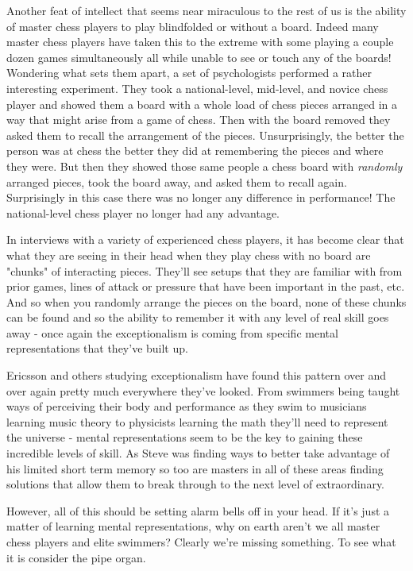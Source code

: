 \documentclass[11pt,a5paper]{book}
\begin{document}
Another feat of intellect that seems near miraculous to the rest of us is the ability of master chess players to play blindfolded or without a board. Indeed many master chess players have taken this to the extreme with some playing a couple dozen games simultaneously all while unable to see or touch any of the boards! Wondering what sets them apart, a set of psychologists performed a rather interesting experiment. They took a national-level, mid-level, and novice chess player and showed them a board with a whole load of chess pieces arranged in a way that might arise from a game of chess. Then with the board removed they asked them to recall the arrangement of the pieces. Unsurprisingly, the better the person was at chess the better they did at remembering the pieces and where they were. But then they showed those same people a chess board with \textit{randomly} arranged pieces, took the board away, and asked them to recall again. Surprisingly in this case there was no longer any difference in performance! The national-level chess player no longer had any advantage. 
\newline

In interviews with a variety of experienced chess players, it has become clear that what they are seeing in their head when they play chess with no board are "chunks" of interacting pieces. They'll see setups that they are familiar with from prior games, lines of attack or pressure that have been important in the past, etc. And so when you randomly arrange the pieces on the board, none of these chunks can be found and so the ability to remember it with any level of real skill goes away - once again the exceptionalism is coming from specific mental representations that they've built up. 
\newline 

Ericsson and others studying exceptionalism have found this pattern over and over again pretty much everywhere they've looked. From swimmers being taught ways of perceiving their body and performance as they swim to musicians learning music theory to physicists learning the math they'll need to represent the universe - mental representations seem to be the key to gaining these incredible levels of skill. As Steve was finding ways to better take advantage of his limited short term memory so too are masters in all of these areas finding solutions that allow them to break through to the next level of extraordinary. 
\newline

However, all of this should be setting alarm bells off in your head. If it's just a matter of learning mental representations, why on earth aren't we all master chess players and elite swimmers? Clearly we're missing something. To see what it is consider the pipe organ.
\newline
\end{document}
